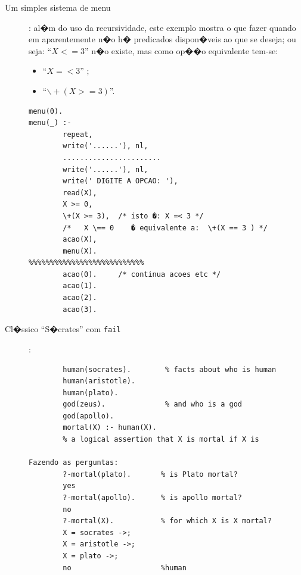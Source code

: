 \documentclass[final,a4paper]{article}
\begin{document}
\begin{description}

\item [Um simples sistema de menu]: al�m do uso da recursividade, este exemplo  mostra o que fazer quando
{em aparentemente} n�o h� predicados dispon�veis  ao que
se deseja; ou seja: ``$X <= 3$'' n�o existe, mas como op��o
 equivalente tem-se:
\begin{itemize}
\item ``$X =< 3$'' ;
\item  ``$\backslash +(X >= 3)$''.
\end{itemize}
{\small
\begin{verbatim}
menu(0).
menu(_) :-
        repeat,
        write('......'), nl,
        .......................
        write('......'), nl,
        write(' DIGITE A OPCAO: '),
        read(X),
        X >= 0,
        \+(X >= 3),  /* isto �: X =< 3 */
        /*   X \== 0    � equivalente a:  \+(X == 3 ) */
        acao(X),
        menu(X).
%%%%%%%%%%%%%%%%%%%%%%%%%%%
        acao(0).     /* continua acoes etc */
        acao(1).
        acao(2).
        acao(3).
\end{verbatim}
} %

\newpage
\item [Cl�ssico ``S�crates'' com \texttt{fail}]:

\begin{lstlisting}
        human(socrates).        % facts about who is human
        human(aristotle).
        human(plato).
        god(zeus).              % and who is a god
        god(apollo).
        mortal(X) :- human(X).   
        % a logical assertion that X is mortal if X is

Fazendo as perguntas:
        ?-mortal(plato).       % is Plato mortal?
        yes
        ?-mortal(apollo).      % is apollo mortal?
        no
        ?-mortal(X).           % for which X is X mortal?
        X = socrates ->;
        X = aristotle ->;
        X = plato ->;
        no                     %human


\end{lstlisting}
\end{description}
\end{document}
